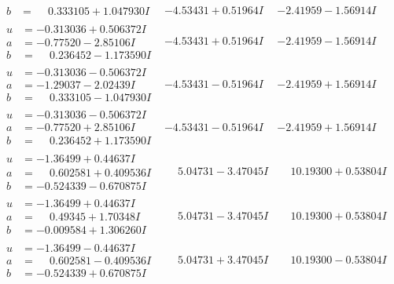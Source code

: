 \documentclass[1p]{elsarticle_modified}
\theoremstyle{definition}
\begin{document}
$$\begin{array}{c|c|c}
\begin{aligned}
b &= \phantom{-}0.333105 + 1.047930 I\end{aligned}
 & -4.53431 + 0.51964 I & -2.41959 - 1.56914 I \\ \hline\begin{aligned}
u &= -0.313036 + 0.506372 I \\
a &= -0.77520 - 2.85106 I \\
b &= \phantom{-}0.236452 - 1.173590 I\end{aligned}
 & -4.53431 + 0.51964 I & -2.41959 - 1.56914 I \\ \hline\begin{aligned}
u &= -0.313036 - 0.506372 I \\
a &= -1.29037 - 2.02439 I \\
b &= \phantom{-}0.333105 - 1.047930 I\end{aligned}
 & -4.53431 - 0.51964 I & -2.41959 + 1.56914 I \\ \hline\begin{aligned}
u &= -0.313036 - 0.506372 I \\
a &= -0.77520 + 2.85106 I \\
b &= \phantom{-}0.236452 + 1.173590 I\end{aligned}
 & -4.53431 - 0.51964 I & -2.41959 + 1.56914 I \\ \hline\begin{aligned}
u &= -1.36499 + 0.44637 I \\
a &= \phantom{-}0.602581 + 0.409536 I \\
b &= -0.524339 - 0.670875 I\end{aligned}
 & \phantom{-}5.04731 - 3.47045 I & \phantom{-}10.19300 + 0.53804 I \\ \hline\begin{aligned}
u &= -1.36499 + 0.44637 I \\
a &= \phantom{-}0.49345 + 1.70348 I \\
b &= -0.009584 + 1.306260 I\end{aligned}
 & \phantom{-}5.04731 - 3.47045 I & \phantom{-}10.19300 + 0.53804 I \\ \hline\begin{aligned}
u &= -1.36499 - 0.44637 I \\
a &= \phantom{-}0.602581 - 0.409536 I \\
b &= -0.524339 + 0.670875 I\end{aligned}
 & \phantom{-}5.04731 + 3.47045 I & \phantom{-}10.19300 - 0.53804 I \\ \hline\begin{aligned}

\end{aligned}
\end{array}$$
\end{document}
